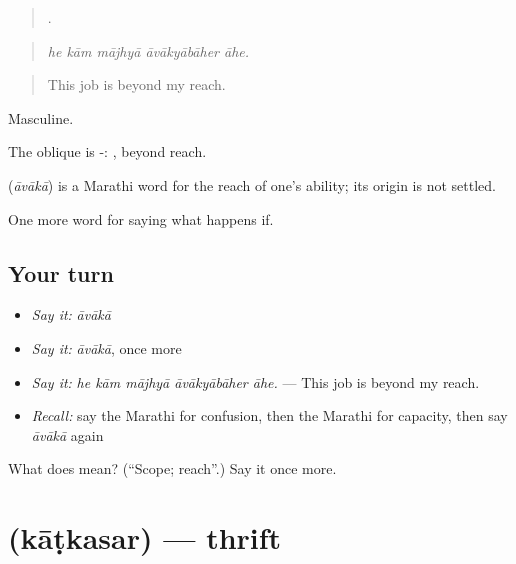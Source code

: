 \begin{quote}
    .
\end{quote}

\begin{quote}
\emph{he kām mājhyā āvākyābāher āhe.}
\end{quote}

\begin{quote}
This job is beyond my reach.
\end{quote}

Masculine.

The oblique is -: , beyond reach.

\begin{cousinweb}
\textbf{} (\emph{āvākā}) is a Marathi word for the reach of one's ability; its origin is not settled.
\end{cousinweb}

\begin{grammarlens}[title={What you've built}]
One more word for saying what happens if.
\end{grammarlens}

\subsection*{Your turn}
\begin{itemize}
\raggedright
  \item \emph{Say it:} \emph{āvākā}
  \item \emph{Say it:} \emph{āvākā}, once more
  \item \emph{Say it:} \emph{he kām mājhyā āvākyābāher āhe.} — This job is beyond my reach.
  \item \emph{Recall:} say the Marathi for confusion, then the Marathi for capacity, then say \emph{āvākā} again
\end{itemize}

\begin{tcolorbox}[breakable,colback=teal!4,colframe=teal!35!black,title={Before you move on}]
What does  mean? (\textquotedblleft{}Scope; reach\textquotedblright{}.) Say it once more.
\end{tcolorbox}
\section[\texorpdfstring{\mr{काटकसर} (kāṭkasar)}{काटकसर (kāṭkasar)}]{ (kāṭkasar) — thrift}

